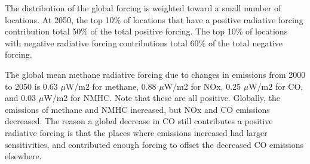 The distribution of the global forcing is weighted toward a small number of locations. At 2050, the top 10\% of locations that have a positive radiative forcing contribution total 50\% of the total positive forcing. The top 10\% of locations with negative radiative forcing contributions total 60\% of the total negative forcing.

The global mean methane radiative forcing due to changes in emissions from 2000 to 2050 is 0.63 $\mu$W/m2 for methane, 0.88 $\mu$W/m2 for NOx, 0.25 $\mu$W/m2 for CO, and 0.03 $\mu$W/m2 for NMHC. Note that these are all positive. Globally, the emissions of methane and NMHC increased, but NOx and CO emissions decreased. The reason a global decrease in CO still contributes a positive radiative forcing is that the places where emissions increased had larger sensitivities, and contributed enough forcing to offset the decreased CO emissions elsewhere.

